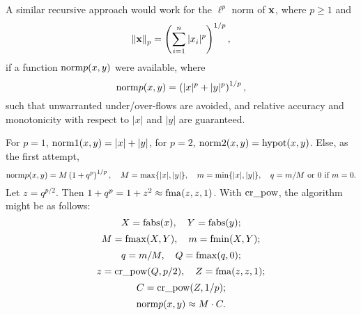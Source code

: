 A similar recursive approach would work for the $\ell^p$ norm of
${\bf x}$, where $p\ge 1$ and
$$\|{\bf x}\|_p^{}=\left(\sum_{i=1}^n|x_i^{}|^p\right)^{1/p},$$
if a function ${\rm norm}p(x,y)$ were available, where
$${\rm norm}p(x,y)=\left(|x|^p+|y|^p\right)^{1/p},$$
such that unwarranted under/over-flows are avoided, and relative
accuracy and monotonicity with respect to $|x|$ and $|y|$ are
guaranteed.

For $p=1$, ${\rm norm}1(x,y)=|x|+|y|$, for $p=2$,
${\rm norm}2(x,y)={\rm hypot}(x,y)$.  Else, as the first attempt,
$${\rm norm}p(x,y)=M\left(1+q^p\right)^{1/p},\quad
M=\max\{|x|,|y|\},\quad
m=\min\{|x|,|y|\},\quad
q=m/M \hbox{ or 0 if } m=0.$$
Let $z=q^{p/2}$.  Then $1+q^p=1+z^2\approx{\rm fma}(z,z,1)$.
With ${\rm cr\_pow}$, the algorithm might be as follows:
$$X={\rm fabs}(x),\quad Y={\rm fabs}(y);$$
$$M={\rm fmax}(X,Y),\quad m={\rm fmin}(X,Y);$$
$$q=m/M,\quad Q={\rm fmax}(q,0);$$
$$z={\rm cr\_pow}(Q,p/2),\quad Z={\rm fma}(z,z,1);$$
$$C={\rm cr\_pow}(Z,1/p);$$
$${\rm norm}p(x,y)\approx M\cdot C.$$
\bye
